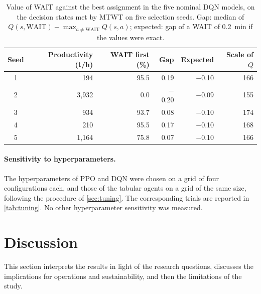 \documentclass[11pt,a4paper]{article}
\newif\ifrevmarks
\newcommand{\revtag}[1]{\ifrevmarks\textsuperscript{\textcolor{red!70!black}{\scriptsize[#1]}}\fi}
\newenvironment{revbloc}[1]{\par\ifrevmarks\color{revcolor}\noindent\revtag{#1}\ \fi}{\par}
\newif\ifcorrmarks
\newenvironment{corrbloc}{\par\ifcorrmarks\color{corrcolor}\fi}{\par}
\begin{document}
\begin{revbloc}{T31}
\begin{corrbloc}
\begin{table}[H]
\centering
\caption{Value of WAIT against the best assignment in the five nominal DQN models, on the decision states met by MTWT on five selection seeds. Gap: median of $Q(s,\mathrm{WAIT}) - \max_{a \neq \mathrm{WAIT}} Q(s,a)$; expected: gap of a WAIT of 0.2~min if the values were exact.}
\label{tab:dqndiag}
\small
\begin{tabular}{@{}crrrrr@{}}
\toprule
\textbf{Seed} & \textbf{Productivity (t/h)} & \textbf{WAIT first (\%)} & \textbf{Gap} & \textbf{Expected} & \textbf{Scale of $Q$} \\
\midrule
1 & 194 & 95.5 & 0.19 & $-$0.10 & 166 \\
2 & 3{,}932 & 0.0 & $-$0.20 & $-$0.09 & 155 \\
3 & 934 & 93.7 & 0.08 & $-$0.10 & 174 \\
4 & 210 & 95.5 & 0.17 & $-$0.10 & 168 \\
5 & 1{,}164 & 75.8 & 0.07 & $-$0.10 & 166 \\
\bottomrule
\end{tabular}
\end{table}
\end{corrbloc}
\end{revbloc}

\paragraph{Sensitivity to hyperparameters.}
\begin{revbloc}{T31}
The hyperparameters of PPO and DQN were chosen on a grid of four configurations each, and those of the tabular agents on a grid of the same size, following the procedure of \cref{sec:tuning}. The corresponding trials are reported in \cref{tab:tuning}. No other hyperparameter sensitivity was measured.
\end{revbloc}


\section{Discussion}
\label{sec:discussion}

This section interprets the results in light of the research questions, discusses the implications for operations and sustainability, and then the limitations of the study.
\end{document}
